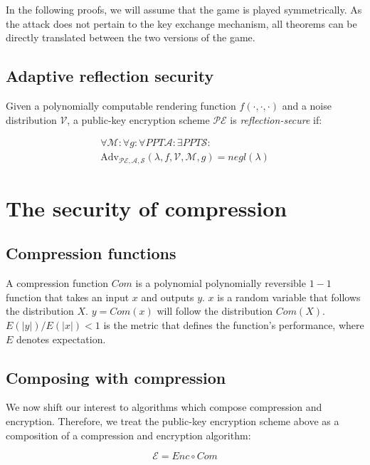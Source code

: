 \documentclass{sig-alternate-05-2015}
\begin{document}
In the following proofs, we will assume that the game is played symmetrically.
As the attack does not pertain to the key exchange mechanism, all theorems can
be directly translated between the two versions of the game.

\subsection{Adaptive reflection security}\label{subsec:adaptiverefsec}

Given a polynomially computable rendering function $f(\cdot, \cdot, \cdot)$ and
a  noise distribution $\mathcal{V}$, a public-key encryption scheme
$\mathcal{PE}$ is \textit{reflection-secure} if:

\begin{align*}
\forall \mathcal{M}:
\forall g:
\forall PPT \mathcal{A}:
\exists PPT \mathcal{S}:\\
\text{Adv}_{\mathcal{PE}, \mathcal{A}, \mathcal{S}}(\lambda, f, \mathcal{V}, \mathcal{M}, g) = negl(\lambda)
\end{align*}

\section{The security of compression}\label{sec:comsec}

\subsection{Compression functions}\label{subsec:comfunc}

A compression function $Com$ is a polynomial polynomially reversible $1 - 1$
function that takes an input $x$ and outputs $y$. $x$ is a random variable that
follows the distribution $X$. $y = Com(x)$ will follow the
distribution $Com(X)$.  $E(|y|) / E(|x|) < 1$ is the metric that defines the
function's performance, where $E$ denotes expectation.

\subsection{Composing with compression}\label{subsec:comcompose}

We now shift our interest to algorithms which compose compression and
encryption.  Therefore, we treat the public-key encryption scheme above as a
composition of a compression and encryption algorithm:

\begin{equation*}
    \mathcal{E} = Enc \circ Com
\end{equation*}
\end{document}
